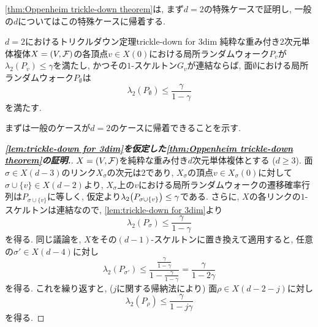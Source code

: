 \cref{thm:Oppenheim trickle-down theorem}は, まず$d=2$の特殊ケースで証明し, 一般の$d$についてはこの特殊ケースに帰着する.
%
\begin{lemma}{\texorpdfstring{$d=2$}{2次元}におけるトリクルダウン定理}{trickle-down for 3dim}
    純粋な重み付き$2$次元単体複体$X=(V,\mathcal{F})$の各頂点$v\in X(0)$における局所ランダムウォーク$P_v$が$\lambda_2(P_v) \le \gamma$を満たし, かつその$1$-スケルトン$G_v$が連結ならば, 面$\emptyset$における局所ランダムウォーク$P_\emptyset$は
    \[
        \lambda_2(P_\emptyset) \le \frac{\gamma}{1-\gamma}
    \]
    を満たす.
\end{lemma}
まずは一般のケースが$d=2$のケースに帰着できることを示す.
%
\begin{proof}[\textbf{\cref{lem:trickle-down for 3dim}を仮定した\cref{thm:Oppenheim trickle-down theorem}の証明.}]
    $X=(V,\mathcal{F})$を純粋な重み付き$d$次元単体複体とする ($d\ge 3$).
    面$\sigma \in X(d-3)$のリンク$X_\sigma$の次元は$2$であり,
    $X_\sigma$の頂点$v\in X_\sigma(0)$に対して
    $\sigma \cup \{v\} \in X(d-2)$より,
    $X_\sigma$上の$v$における局所ランダムウォークの遷移確率行列は$P_{\sigma\cup \{v\}}$に等しく, 仮定より$\lambda_2\rbra*{P_{\sigma\cup\{v\}}}\le \gamma$である.
    さらに, $X$の各リンクの$1$-スケルトンは連結なので, \cref{lem:trickle-down for 3dim}より
    \[
        \lambda_2(P_\sigma) \le \frac{\gamma}{1-\gamma}
    \]
    を得る.
    同じ議論を, $X$をその$(d-1)$-スケルトンに置き換えて適用すると,
    任意の$\sigma' \in X(d-4)$に対し
    \[
        \lambda_2(P_{\sigma'}) \le \frac{\frac{\gamma}{1-\gamma}}{1- \frac{\gamma}{1-\gamma}} = \frac{\gamma}{1-2\gamma}
    \]
    を得る.
    これを繰り返すと, ($j$に関する帰納法により)
    面$\rho \in X(d-2-j)$に対し
    \[
        \lambda_2(P_\rho) \le \frac{\gamma}{1-j\gamma}
    \]
    を得る.
\end{proof}
%
